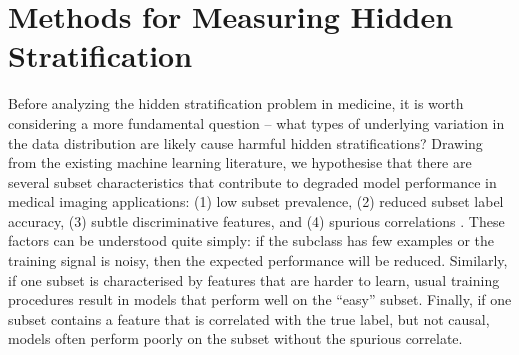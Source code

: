 \documentclass{article}
\begin{document}

\section{Methods for Measuring Hidden Stratification}
Before analyzing the hidden stratification problem in medicine, it is worth considering a more fundamental question -- what types of underlying variation in the data distribution are likely cause harmful hidden stratifications?  
Drawing from the existing machine learning literature, we hypothesise that there are several subset characteristics that contribute to degraded model performance in medical imaging applications: (1) low subset prevalence, (2) reduced subset label accuracy, (3) subtle discriminative features, and (4) spurious correlations \citep{Selbst2017-gz}. These factors can be understood quite simply: if the subclass has few examples or the training signal is noisy, then the expected performance will be reduced.  Similarly, if one subset is characterised by features that are harder to learn, usual training procedures result in models that perform well on the ``easy'' subset.
Finally, if one subset contains a feature that is correlated with the true label, but not causal, models often perform poorly on the subset without the spurious correlate.
\end{document}
